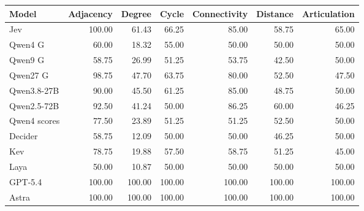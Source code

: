 \begin{tabular}{lrrrrrr}
\toprule
Model & Adjacency & Degree & Cycle & Connectivity & Distance & Articulation \\
\midrule
Jev & 100.00 & 61.43 & 66.25 & 85.00 & 58.75 & 65.00 \\
Qwen4 G & 60.00 & 18.32 & 55.00 & 50.00 & 50.00 & 50.00 \\
Qwen9 G & 58.75 & 26.99 & 51.25 & 53.75 & 42.50 & 50.00 \\
Qwen27 G & 98.75 & 47.70 & 63.75 & 80.00 & 52.50 & 47.50 \\
Qwen3.8-27B & 90.00 & 45.50 & 61.25 & 85.00 & 48.75 & 50.00 \\
Qwen2.5-72B & 92.50 & 41.24 & 50.00 & 86.25 & 60.00 & 46.25 \\
Qwen4 scores & 77.50 & 23.89 & 51.25 & 51.25 & 52.50 & 50.00 \\
Decider & 58.75 & 12.09 & 50.00 & 50.00 & 46.25 & 50.00 \\
Kev & 78.75 & 19.88 & 57.50 & 58.75 & 51.25 & 45.00 \\
Laya & 50.00 & 10.87 & 50.00 & 50.00 & 50.00 & 50.00 \\
\midrule
GPT-5.4 & 100.00 & 100.00 & 100.00 & 100.00 & 100.00 & 100.00 \\
Astra & 100.00 & 100.00 & 100.00 & 100.00 & 100.00 & 100.00 \\
\bottomrule
\end{tabular}
